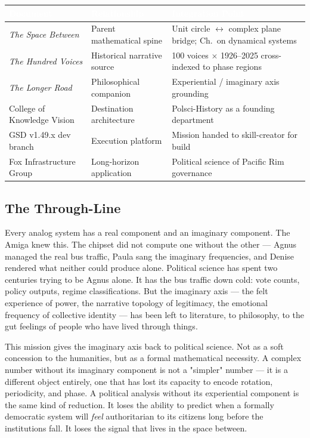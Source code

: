 \documentclass[11pt,letterpaper]{article}
\newcommand{\tableheader}[1]{\textbf{\sffamily\textcolor{white}{#1}}}
\begin{document}
\begin{center}
\begin{tabularx}{\textwidth}{L{3.5cm}L{3.5cm}X}
\toprule
{}
\tableheader{Document} & \tableheader{Relationship} & \tableheader{Integration Point} \\
\midrule
\textit{The Space Between} & Parent mathematical spine & Unit circle $\leftrightarrow$ complex plane bridge; Ch.\ on dynamical systems \\
\textit{The Hundred Voices} & Historical narrative source & 100 voices $\times$ 1926--2025 cross-indexed to phase regions \\
\textit{The Longer Road} & Philosophical companion & Experiential / imaginary axis grounding \\
College of Knowledge Vision & Destination architecture & Polsci-History as a founding department \\
GSD v1.49.x dev branch & Execution platform & Mission handed to skill-creator for build \\
Fox Infrastructure Group & Long-horizon application & Political science of Pacific Rim governance \\
\bottomrule
\end{tabularx}
\end{center}

\subsection{The Through-Line}

Every analog system has a real component and an imaginary component. The Amiga knew this. The chipset did not compute one without the other --- Agnus managed the real bus traffic, Paula sang the imaginary frequencies, and Denise rendered what neither could produce alone. Political science has spent two centuries trying to be Agnus alone. It has the bus traffic down cold: vote counts, policy outputs, regime classifications. But the imaginary axis --- the felt experience of power, the narrative topology of legitimacy, the emotional frequency of collective identity --- has been left to literature, to philosophy, to the gut feelings of people who have lived through things.

This mission gives the imaginary axis back to political science. Not as a soft concession to the humanities, but as a formal mathematical necessity. A complex number without its imaginary component is not a "simpler" number --- it is a different object entirely, one that has lost its capacity to encode rotation, periodicity, and phase. A political analysis without its experiential component is the same kind of reduction. It loses the ability to predict when a formally democratic system will \textit{feel} authoritarian to its citizens long before the institutions fall. It loses the signal that lives in the space between.
\end{document}

